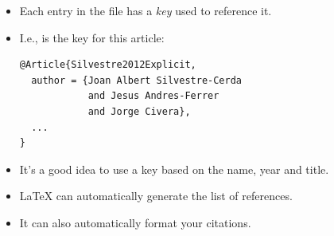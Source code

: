 \documentclass{beamer}
\begin{document}
\begin{frame}[fragile]{\insertsubsection{}}
\begin{itemize}
\item Each entry in the  file has a \emph{key} used to
reference it.
\item I.e.,  is the key for this article:
\begin{verbatim}
@Article{Silvestre2012Explicit,
  author = {Joan Albert Silvestre-Cerda 
            and Jesus Andres-Ferrer
            and Jorge Civera},
  ...
}
\end{verbatim}
\item It's a good idea to use a key based on the name, year and title.
\item \LaTeX{} can automatically generate the list of references.
\item It can also automatically format your citations.
\end{itemize}
\end{frame}


\end{document}
